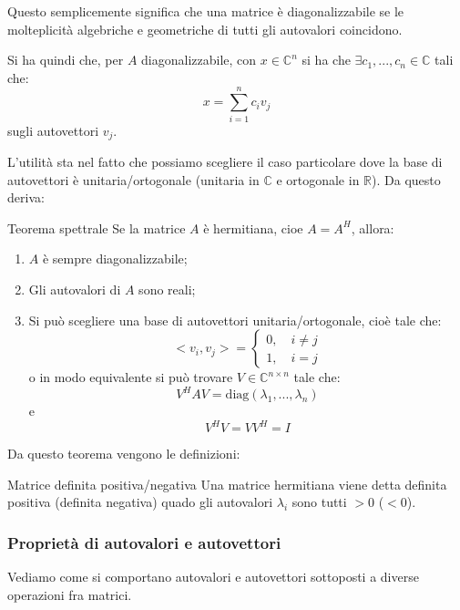 \documentclass[a4paper,11pt]{article}
\begin{document}
Questo semplicemente significa che una matrice è diagonalizzabile se le molteplicità algebriche e geometriche di tutti gli autovalori coincidono. 

Si ha quindi che, per $A$ diagonalizzabile, con $x \in \mathbb{C}^n$ si ha che $\exists c_1, ..., c_n \in \mathbb{C}$ tali che:
$$
x = \sum_{i = 1}^n c_i v_j
$$
sugli autovettori $v_j$.

L'utilità sta nel fatto che possiamo scegliere il caso particolare dove la base di autovettori è unitaria/ortogonale (unitaria in $\mathbb{C}$ e ortogonale in $\mathbb{R}$).
Da questo deriva:
\begin{theorem}{Teorema spettrale}
	Se la matrice $A$ è hermitiana, cioe $A = A^H$, allora:
	\begin{enumerate}
		\item $A$ è sempre diagonalizzabile;
		\item Gli autovalori di $A$ sono reali;
		\item Si può scegliere una base di autovettori unitaria/ortogonale, cioè tale che:
			\[
				< v_i, v_j > = 	
				\begin{cases}
					0, \quad i \neq j \\ 
					1, \quad i = j
				\end{cases}
			\]
			o in modo equivalente si può trovare $V \in \mathbb{C}^{n \times n}$ tale che:
			$$
				V^H A V = \mathrm{diag}(\lambda_1, ..., \lambda_n)
			$$
			e
			$$
			V^H V = V V^H = I
			$$
	\end{enumerate}
\end{theorem}

Da questo teorema vengono le definizioni:
\begin{definition}{Matrice definita positiva/negativa}
	Una matrice hermitiana viene detta definita positiva (definita negativa) quado gli autovalori $\lambda_i$ sono tutti $> 0$ ($< 0$).
\end{definition}

\subsubsection{Proprietà di autovalori e autovettori}
Vediamo come si comportano autovalori e autovettori sottoposti a diverse operazioni fra matrici.
\end{document}
